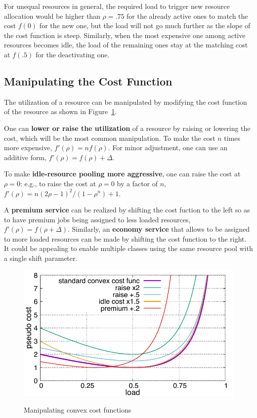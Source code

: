 For unequal resources in general, the required load to trigger new
resource allocation would be higher than $\rho = .75$ for the already
active ones to match the cost $f(0)$ for the new one, but the load
will not go much further as the slope of the cost function is steep.
Similarly, when the most expensive one among active resources becomes
idle, the load of the remaining ones stay at the matching cost at
$f(.5)$ for the deactivating one.


\subsection{Manipulating the Cost Function}
\label{sec:variation}

The utilization of a resource can be manipulated by modifying the cost
function of the resource as shown in Figure~\ref{fig:costfunc3}.

One can {\bf lower or raise the utilization} of a resource by raising or
lowering the cost, which will be the most common manipulation.
To make the cost $n$ times more expensive, $f'(\rho) = n f(\rho)$.
For minor adjustment, one can use an additive form,
$f'(\rho) = f(\rho) + \Delta$.

To make {\bf idle-resource pooling more aggressive},
one can raise the cost at $\rho = 0$:
e.g., to raise the cost at $\rho = 0$ by a factor of $n$,
$f'(\rho) = n (2\rho - 1)^{2}/(1 - \rho^{n}) + 1$.

A {\bf premium service} can be realized by shifting the cost fuction
to the left so as to have premium jobs being assigned to less loaded
resources, 
$f'(\rho) = f(\rho + \Delta)$.
Similarly, an {\bf economy service} that allows to be assigned to more
loaded resources can be made by shifting the cost function to the
right.  It could be appealing to enable multiple classes using the same
resource pool with a single shift parameter.

\begin{figure}[tb]
  \begin{center}
    \includegraphics[width=1.0\columnwidth]{costfunc3.pdf}
    \vspace{-2.0ex}
    \caption{Manipulating convex cost functions}
    \label{fig:costfunc3}
  \end{center}
\end{figure}



